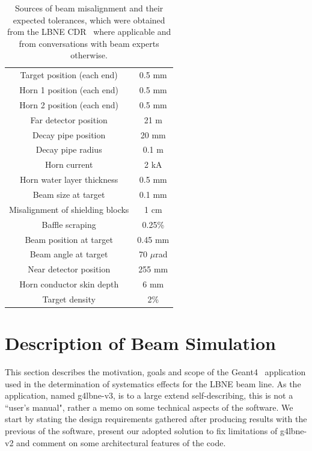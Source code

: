 \begin{table}
\centering
\begin{tabular}{ | c | c | }
\hline
  Target position (each end) & 0.5 mm \\
  Horn 1 position (each end) & 0.5 mm \\
  Horn 2 position (each end) & 0.5 mm \\
  Far detector position & 21 m \\
  Decay pipe position & 20 mm \\
  Decay pipe radius & 0.1 m \\
  Horn current & 2 kA \\
  Horn water layer thickness & 0.5 mm \\
  Beam size at target & 0.1 mm \\
  Misalignment of shielding blocks & 1 cm \\
  Baffle scraping & 0.25\% \\
  Beam position at target & 0.45 mm \\
  Beam angle at target & 70 $\mu$rad \\
  Near detector position & 255 mm \\
  Horn conductor skin depth & 6 mm \\
  Target density & 2\% \\ 
\hline
\end{tabular}
\caption{Sources of beam misalignment and their expected tolerances, which were obtained from the LBNE CDR~\cite{lbnecdr} where applicable and from conversations with beam experts otherwise.}
\label{tab:syslist}
\end{table}

\section{Description of Beam Simulation}
\label{sec:beamsim}

This section describes the motivation, goals and scope of the Geant4~\cite{Geant4} application used in the determination of systematics effects for the LBNE   beam line. As the application, named g4lbne-v3, is to a large extend self-describing, this is not a ``user's manual", rather a memo on some technical   aspects of the software. We start by stating the design requirements gathered after producing results with the previous of the software, present   our adopted solution to fix limitations of g4lbne-v2 and comment on some architectural features of the code. 

